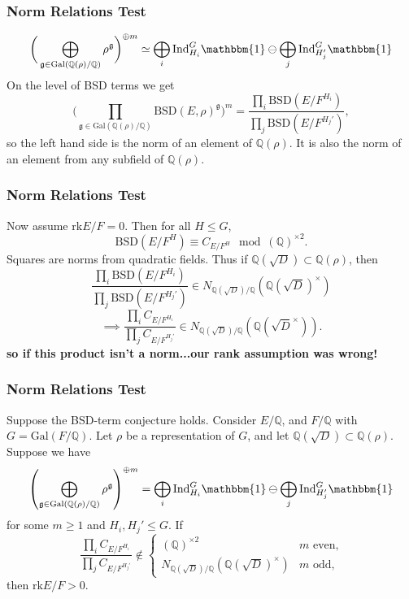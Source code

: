 \documentclass{beamer}
\newcommand{\Gal}{\mathrm{Gal}}
\newcommand{\BSD}{\mathrm{BSD}}
\newcommand{\rk}{\mathrm{rk}}
\newcommand{\trivial}{\mathbbm{1}}
\newcommand{\Ind}{\mathrm{Ind}}
\newcommand{\QQ}{\mathbb{Q}}
\newcommand{\fg}{\mathfrak{g}}
\newcommand{\bQ}{\mathbb{Q}}
\theoremstyle{plain}
\begin{document}
\begin{frame}
    \frametitle{Norm Relations Test}
    $$\bigg(\bigoplus_{\fg \in \Gal(\bQ(\rho) / \bQ)} \rho^{\fg}\bigg)^{\oplus m} \simeq \bigoplus_{i} \Ind_{H_i}^G \trivial \ominus \bigoplus_{j} \Ind_{H_j'}^G \trivial$$ \pause
    On the level of BSD terms we get
    $$\bigg(\prod_{\fg \in \Gal(\bQ(\rho) / \bQ)} \BSD(E, \rho)^{\fg}\bigg)^m = \frac{\prod_i \BSD(E / F^{H_i})}{\prod_j \BSD(E / F^{H_j'})} ,$$
    \pause so the left hand side is the norm of an element of $\bQ(\rho)$. \pause It is also the norm of an element from any subfield of $\bQ(\rho)$. 
\end{frame}

\begin{frame}
    \frametitle{Norm Relations Test}
    Now assume $\rk E / F = 0$. Then for all $H \leq G$, 
    $$ \BSD(E / F^{H}) \equiv C_{E / F^H} \mod (\bQ)^{\times 2}.$$ \pause
    Squares are norms from quadratic fields. \pause Thus if $\bQ(\sqrt{D}) \subset \bQ(\rho)$, then 
   $$\frac{\prod_i \BSD(E / F^{H_i})}{\prod_j \BSD(E / F^{H_j'})} \in N_{\bQ(\sqrt{D}) / \bQ}(\bQ(\sqrt{D})^{\times})$$ \pause $$\implies 
   \frac{\prod_i C_{E / F^{H_i}}}{\prod_j C_{E / F^{H_j'}}} \in N_{\bQ(\sqrt{D}) / \bQ}(\bQ(\sqrt{D}^{\times})). $$\pause
   \textbf{so if this product isn't a norm...\pause our rank assumption was wrong!}
\end{frame}

\begin{frame}
    \frametitle{Norm Relations Test}
    \begin{theorem}\label{thm_positive_rank}
    \small{  Suppose the BSD-term conjecture holds. Consider $E/\QQ$, and $F/\QQ$  with $G = \Gal(F / \bQ)$. Let $\rho$ be a representation of $G$, and let $\bQ(\sqrt{D}) \subset \bQ(\rho)$. Suppose we have  
        $$\left(\bigoplus_{\mathfrak{g}\in\Gal(\QQ(\rho)/\QQ)}\rho^{\mathfrak{g}}\right)^{\oplus m}=\bigoplus_i\Ind_{H_i}^G\mathbbm{1}\ominus\bigoplus_j\Ind_{H'_j}^G\mathbbm{1}$$
        for some $m\geq 1$ and $H_i, H_j' \leq G$. If 
        $$\frac{\prod_i C_{E/F^{H_i}}}{\prod_j C_{E/F^{H_j'}}} \not\in
        \begin{cases}
            (\bQ)^{\times 2} & m \text{ even,}\\
            N_{\bQ(\sqrt{D}) / \bQ}(\bQ(\sqrt{D})^{\times}) & m \text{ odd,}
        \end{cases}
        $$
        then $\rk E / F > 0.$ }
    \end{theorem}
\end{frame}
\end{document}
